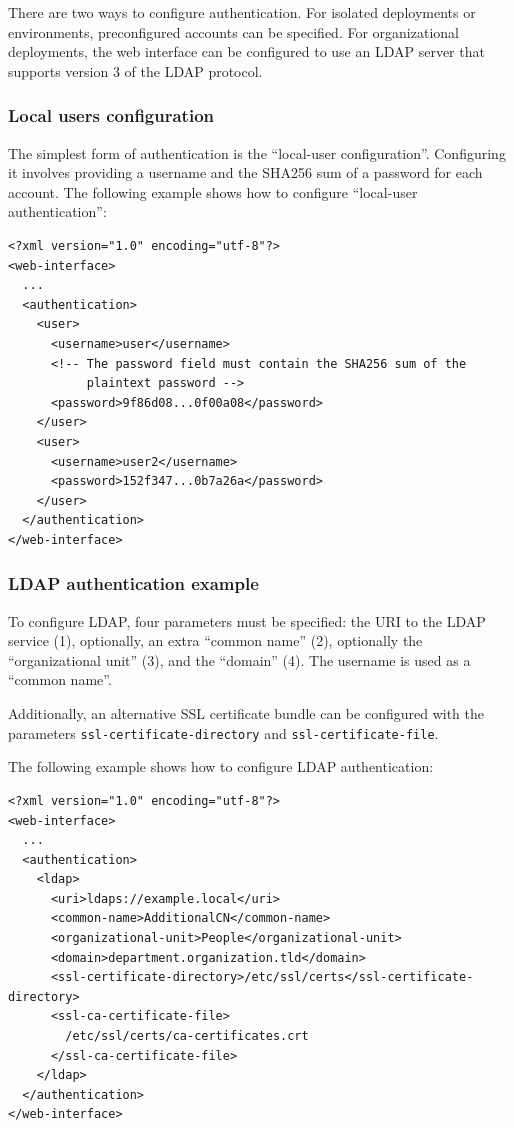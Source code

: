   There are two ways to configure authentication.  For isolated deployments
  or environments, preconfigured accounts can be specified.  For organizational
  deployments, the web interface can be configured to use an LDAP server that
  supports version 3 of the LDAP protocol.

\subsubsection{Local users configuration}

  The simplest form of authentication is the ``local-user configuration''.
  Configuring it involves providing a username and the SHA256 sum of a password
  for each account.  The following example shows how to configure
  ``local-user authentication'':

\begin{siderules}
\begin{verbatim}
<?xml version="1.0" encoding="utf-8"?>
<web-interface>
  ...
  <authentication>
    <user>
      <username>user</username>
      <!-- The password field must contain the SHA256 sum of the
           plaintext password -->
      <password>9f86d08...0f00a08</password>
    </user>
    <user>
      <username>user2</username>
      <password>152f347...0b7a26a</password>
    </user>
  </authentication>
</web-interface>
\end{verbatim}
\end{siderules}

\subsubsection{LDAP authentication example}

  To configure LDAP, four parameters must be specified: the URI to the LDAP
  service (1), optionally, an extra ``common name'' (2), optionally the
  ``organizational unit'' (3), and the ``domain'' (4).  The username is used
  as a ``common name''.

  \begin{sloppypar}
  Additionally, an alternative SSL certificate bundle can be configured with
  the parameters \texttt{ssl-certificate-directory} and
  \texttt{ssl-certificate-file}.
  \end{sloppypar}

  The following example shows how to configure LDAP authentication:

\begin{siderules}
\begin{verbatim}
<?xml version="1.0" encoding="utf-8"?>
<web-interface>
  ...
  <authentication>
    <ldap>
      <uri>ldaps://example.local</uri>
      <common-name>AdditionalCN</common-name>
      <organizational-unit>People</organizational-unit>
      <domain>department.organization.tld</domain>
      <ssl-certificate-directory>/etc/ssl/certs</ssl-certificate-directory>
      <ssl-ca-certificate-file>
        /etc/ssl/certs/ca-certificates.crt
      </ssl-ca-certificate-file>
    </ldap>
  </authentication>
</web-interface>
\end{verbatim}
\end{siderules}


